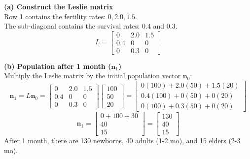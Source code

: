 \begin{solution}
\textbf{(a) Construct the Leslie matrix} \\
Row 1 contains the fertility rates: $0, 2.0, 1.5$. \\
The sub-diagonal contains the survival rates: $0.4$ and $0.3$.
\[
L = \begin{bmatrix} 
0 & 2.0 & 1.5 \\ 
0.4 & 0 & 0 \\ 
0 & 0.3 & 0 
\end{bmatrix}
\]

\medskip
\textbf{(b) Population after 1 month ($\mathbf{n}_1$)} \\
Multiply the Leslie matrix by the initial population vector $\mathbf{n}_0$:
\[
\mathbf{n}_1 = L \mathbf{n}_0 = 
\begin{bmatrix} 0 & 2.0 & 1.5 \\ 0.4 & 0 & 0 \\ 0 & 0.3 & 0 \end{bmatrix}
\begin{bmatrix} 100 \\ 50 \\ 20 \end{bmatrix}
= 
\begin{bmatrix} 
0(100) + 2.0(50) + 1.5(20) \\ 
0.4(100) + 0(50) + 0(20) \\ 
0(100) + 0.3(50) + 0(20) 
\end{bmatrix}
\]
\[
\mathbf{n}_1 = \begin{bmatrix} 0 + 100 + 30 \\ 40 \\ 15 \end{bmatrix} = \begin{bmatrix} 130 \\ 40 \\ 15 \end{bmatrix}
\]
After 1 month, there are 130 newborns, 40 adults (1-2 mo), and 15 elders (2-3 mo).


\end{solution}
